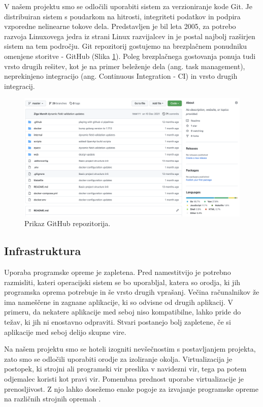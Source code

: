 V našem projektu smo se odločili uporabiti sistem za verzioniranje kode Git. Je distribuiran sistem s poudarkom na hitrosti, integriteti podatkov in podpira vzporedne nelinearne tokove dela. Predstavljen je bil leta 2005, za potrebo razvoja Linuxovega jedra iz strani Linux razvijalcev \cite{git-history} in je postal najbolj razširjen sistem na tem področju. Git repozitorij gostujemo na brezplačnem ponudniku omenjene storitve - GitHub (Slika \ref{github-project}). Poleg brezplačnega gostovanja ponuja tudi vrsto drugih rešitev, kot je na primer beleženje dela (ang. task management), neprekinjeno integracijo (ang. Continuous Integration - CI) in vrsto drugih integracij.

\begin{figure}[h]
\begin{center}
\includegraphics[width=1\textwidth]{slike/github.png}
\end{center}
\caption{ Prikaz GitHub repozitorija. }
\label{github-project}
\end{figure}

\subsection{Infrastruktura}
Uporaba programske opreme je zapletena. Pred namestitvijo je potrebno razmisliti, kateri operacijski sistem se bo uporabljal, katera so orodja, ki jih programska oprema potrebuje in še vrsto drugih vprašanj. Večina računalnikov že ima nameščene in zagnane aplikacije, ki so odvisne od drugih aplikacij. V primeru, da nekatere aplikacije med seboj niso kompatibilne, lahko pride do težav, ki jih ni enostavno odpraviti. Stvari postanejo bolj zapletene, če si aplikacije med seboj delijo skupne vire.

Na našem projektu smo se hoteli izogniti nevšečnostim s postavljanjem projekta, zato smo se odločili uporabiti orodje za izoliranje okolja. Virtualizacija je postopek, ki strojni ali programski vir preslika v navidezni vir, tega pa potem odjemalec koristi kot pravi vir. Pomembna prednost uporabe virtualizacije je prenosljivost. Z njo lahko dosežemo enake pogoje za izvajanje programske opreme na različnih strojnih opremah \cite{docker-in-action}.

